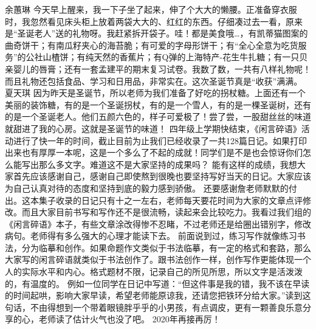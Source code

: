 {}\markdownRendererInterblockSeparator
{}余蕙琳\markdownRendererInterblockSeparator
{}今天早上醒来，我一下子坐了起来，伸了个大大的懒腰。正准备穿衣服时，我忽然看见床头柜上放着两袋大大的、红红的东西。仔细凑过去一看，原来是“圣诞老人”送的礼物呀。我赶紧拆开袋子。哇！都是美食哦…，有凯蒂猫图案的曲奇饼干；有南瓜籽夹心的海苔脆；有可爱的字母形饼干；有“全心全意为吃货服务”的公社山楂饼；有纯天然的香蕉片；有Q弹的上海特产-花生牛扎糖；有一只贝亲婴儿的唇膏；还有一套孟建平的期末复习试卷。我数了数，一共有八样礼物呢！而且礼物还包括食品、学习和日用品，非常实在。这次圣诞节真是“收获”满满。\markdownRendererInterblockSeparator
{}\markdownRendererInterblockSeparator
{}夏天琪 \markdownRendererInterblockSeparator
{}因为昨天是圣诞节，所以老师为我们准备了好吃的拐杖糖。上面还有一个美丽的装饰糖，有的是一个圣诞拐杖，有的是一个雪人，有的是一棵圣诞树，还有的是一个圣诞老人。他们五颜六色的，样子可爱极了！尝了尝，一股甜丝丝的味道就甜进了我的心房。这就是圣诞节的味道！\markdownRendererInterblockSeparator
{}\markdownRendererInterblockSeparator
{}四年级上学期快结束，《闲言碎语》活动进行了快一年的时间，截止目前为止我们已经收录了一共128篇日记。如果打印出来也有厚厚一本呢，这是一个多么了不起的成就！同学们是不是也会惊讶你们怎么能写出那么多文字。难道这不是大家坚持的成果吗？\markdownRendererInterblockSeparator
{}能有这样的成绩，我想大家首先应该感谢自己，感谢自己即使熬到很晚也要坚持写好当天的日记。大家应该为自己认真对待的态度和坚持到底的毅力感到骄傲。\markdownRendererInterblockSeparator
{}还要感谢詹老师默默的付出。这本集子收录的日记只有十之一左右，老师每天要花时间为大家的文章点评修改。而且大家目前书写和写作还不是很流畅，读起来会比较吃力。我看过我们组的《闲言碎语》本子，有些文章涂改得惨不忍睹，不过老师还是给圈出错别字，修改病句。老师得有多么强大的心理才能读下去。\markdownRendererInterblockSeparator
{}前面说到过，练习写作就像练习书法，分为临摹和创作。如果命题作文类似于书法临摹，有一定的格式和套路，那么大家写的闲言碎语就类似于书法创作了。跟书法创作一样，创作写作更能体现一个人的实际水平和内心。格式题材不限，记录自己的所见所思，所以文字是活泼泼的，有温度的。\markdownRendererInterblockSeparator
{}例如一位同学在日记中写道：“但这件事是我的错，我不该在早读的时间起哄，影响大家早读，希望老师能原谅我，还请您把铁环分给大家。”读到这句话，不由得想到一个带着眼镜胖乎乎的小男孩，有点调皮，更有一颗善良乐意分享的心，老师读了估计火气也没了吧。\markdownRendererInterblockSeparator
{}2020年再接再厉！\markdownRendererDocumentEnd